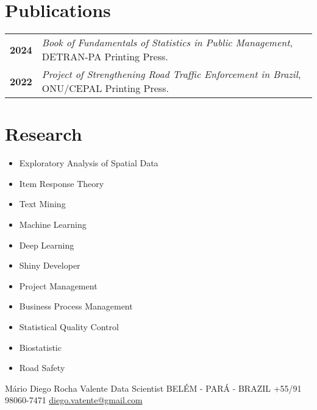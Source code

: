 \documentclass[lighthipster]{simplehipstercv}
\newlength{\rightcolwidth}
\begin{document}
\begin{paracol}{2}
\begin{minipage}[t]{0.3\textwidth}
\end{minipage}\hfill
\begin{minipage}[t]{0.3\textwidth}
\section*{Publications}
\begin{tabular}{>{\footnotesize\bfseries}r >{\footnotesize}p{}}
    2024 & \emph{Book of Fundamentals of Statistics in Public Management}, DETRAN-PA Printing Press. \\
    2022 &  \emph{Project of Strengthening Road Traffic Enforcement in Brazil}, ONU/CEPAL Printing Press.
\end{tabular}
\bigskip

\vspace{1em}
\end{minipage}

\section*{Research}
\begin{itemize}
    \item Exploratory Analysis of Spatial Data
    \item Item Response Theory
    \item Text Mining
    \item Machine Learning
    \item Deep Learning
    \item Shiny Developer
    \item Project Management
    \item Business Process Management
    \item Statistical Quality Control
    \item Biostatistic
    \item Road Safety
\end{itemize}





\vfill{} %

\setlength{\parindent}{0pt}
\begin{minipage}[t]{\rightcolwidth}
\begin{center}\fontfamily{\sfdefault}\selectfont \color{black!70}
{\small Mário Diego Rocha Valente  Data Scientist  BELÉM - PARÁ - BRAZIL  \newline {}  +55/91 98060-7471  \protect\url{diego.vatente@gmail.com}
}
\end{center}
\end{minipage}
\end{paracol}
\end{document}
